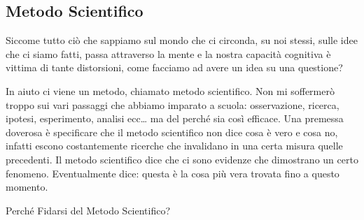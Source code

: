\documentclass[12pt]{book} %
\begin{document}
\bigskip

\subsection{Metodo Scientifico}
Siccome tutto ciò che sappiamo sul mondo che ci circonda, su noi stessi, sulle idee che ci siamo fatti, passa attraverso
la mente e la nostra capacità cognitiva è vittima di tante distorsioni, come facciamo ad avere un idea su una
questione?

In aiuto ci viene un metodo, chiamato metodo scientifico. Non mi soffermerò troppo sui vari passaggi che abbiamo
imparato a scuola: osservazione, ricerca, ipotesi, esperimento, analisi ecc… ma del perché sia così efficace. Una
premessa doverosa è specificare che il metodo scientifico non dice cosa è vero e cosa no, infatti escono costantemente
ricerche che invalidano in una certa misura quelle precedenti. Il metodo scientifico dice che ci sono evidenze che
dimostrano un certo fenomeno. Eventualmente dice: questa è la cosa più vera trovata fino a questo momento.

Perché Fidarsi del Metodo Scientifico? 
\end{document}
